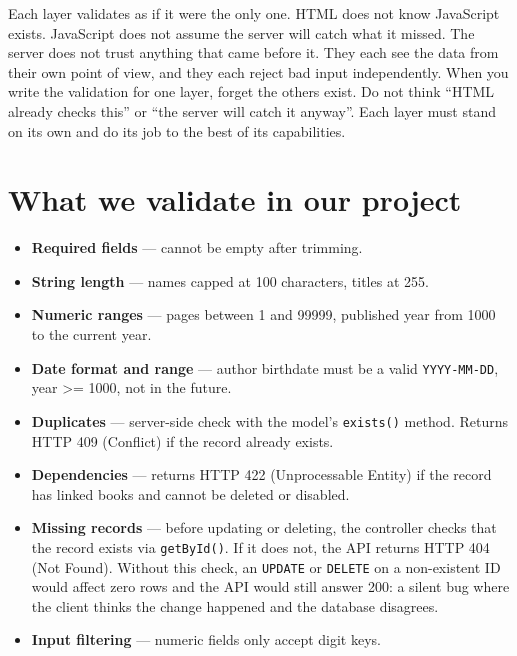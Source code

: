 \documentclass[11pt,a4paper,oneside]{book}
\providecommand{\tightlist}{%
  \setlength{\itemsep}{0pt}\setlength{\parskip}{0pt}}
\begin{document}
Each layer validates as if it were the only one. HTML does not
know JavaScript exists. JavaScript does not assume the server
will catch what it missed. The server does not trust anything
that came before it. They each see the data from their own point
of view, and they each reject bad input independently. When you
write the validation for one layer, forget the others exist. Do
not think ``HTML already checks this'' or ``the server will catch
it anyway''. Each layer must stand on its own and do its job to
the best of its capabilities.

\hypertarget{what-we-validate-in-our-project}{%
\section{What we validate in our
project}\label{what-we-validate-in-our-project}}

\begin{itemize}
\tightlist
\item
  \textbf{Required fields} --- cannot be empty after trimming.
\item
  \textbf{String length} --- names capped at 100 characters,
  titles at 255.
\item
  \textbf{Numeric ranges} --- pages between 1 and 99999,
  published year from 1000 to the current year.
\item
  \textbf{Date format and range} --- author birthdate must be a
  valid \texttt{YYYY-MM-DD}, year \textgreater= 1000, not in the
  future.
\item
  \textbf{Duplicates} --- server-side check with the model's
  \texttt{exists()} method. Returns HTTP 409 (Conflict) if the
  record already exists.
\item
  \textbf{Dependencies} --- returns HTTP 422 (Unprocessable
  Entity) if the record has linked books and cannot be deleted or
  disabled.
\item
  \textbf{Missing records} --- before updating or deleting, the
  controller checks that the record exists via
  \texttt{getById()}. If it does not, the API returns HTTP 404
  (Not Found). Without this check, an \texttt{UPDATE} or
  \texttt{DELETE} on a non-existent ID would affect zero rows and
  the API would still answer 200: a silent bug where the client
  thinks the change happened and the database disagrees.
\item
  \textbf{Input filtering} --- numeric fields only accept digit
  keys.
\end{itemize}
\end{document}

